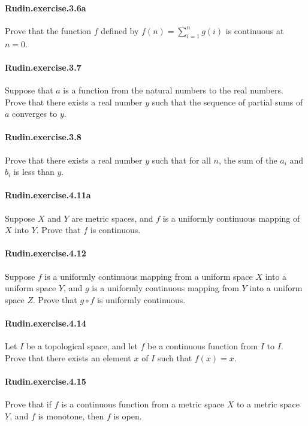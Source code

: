 \documentclass{article}
\begin{document}
\paragraph{Rudin.exercise.3.6a} Prove that the function $f$ defined by $f(n) = \sum_{i=1}^n g(i)$ is continuous at $n=0$.

\paragraph{Rudin.exercise.3.7} Suppose that $a$ is a function from the natural numbers to the real numbers. Prove that there exists a real number $y$ such that the sequence of partial sums of $a$ converges to $y$.

\paragraph{Rudin.exercise.3.8} Prove that there exists a real number $y$ such that for all $n$, the sum of the $a_i$ and $b_i$ is less than $y$.

\paragraph{Rudin.exercise.4.11a} Suppose $X$ and $Y$ are metric spaces, and $f$ is a uniformly continuous mapping of $X$ into $Y$. Prove that $f$ is continuous.

\paragraph{Rudin.exercise.4.12} Suppose $f$ is a uniformly continuous mapping from a uniform space $X$ into a uniform space $Y$, and $g$ is a uniformly continuous mapping from $Y$ into a uniform space $Z$. Prove that $g \circ f$ is uniformly continuous.

\paragraph{Rudin.exercise.4.14} Let $I$ be a topological space, and let $f$ be a continuous function from $I$ to $I$. Prove that there exists an element $x$ of $I$ such that $f(x)=x$.

\paragraph{Rudin.exercise.4.15} Prove that if $f$ is a continuous function from a metric space $X$ to a metric space $Y$, and $f$ is monotone, then $f$ is open.
\end{document}
